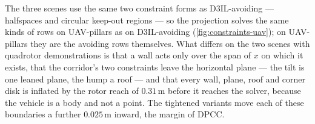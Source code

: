 The three scenes use the same two constraint forms as D3IL-avoiding --- halfspaces and circular
keep-out regions --- so the projection solves the same kinds of rows on UAV-pillars as on D3IL-avoiding
(\autoref{fig:constraints-uav}); on UAV-pillars they are the avoiding rows themselves. What differs on the
two scenes with quadrotor demonstrations is that a wall acts only over the span of $x$ on which it exists,
that the corridor's two constraints leave the horizontal plane --- the tilt is one leaned plane, the hump a
roof --- and that every wall, plane, roof and corner disk is
inflated by the rotor reach of $0.31$\,m before it reaches the solver, because the vehicle is a body and
not a point. The tightened variants move each of these boundaries a further $0.025$\,m inward, the margin
of \ac{DPCC}.

